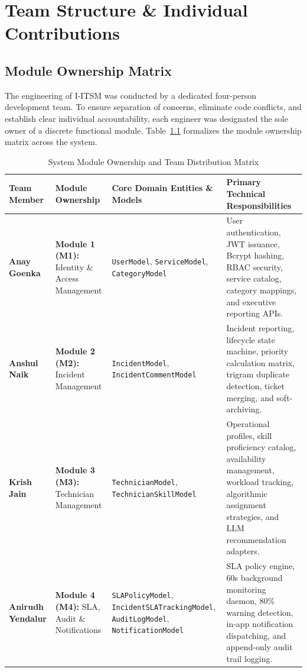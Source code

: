 \documentclass[11pt,a4paper,oneside]{report}
\begin{document}
\chapter{Team Structure \& Individual Contributions}
\label{ch:team_structure}

\section{Module Ownership Matrix}
\label{sec:team_matrix}
The engineering of I-ITSM was conducted by a dedicated four-person development team. To ensure separation of concerns, eliminate code conflicts, and establish clear individual accountability, each engineer was designated the sole owner of a discrete functional module. Table~\ref{tab:team_ownership_matrix} formalizes the module ownership matrix across the system.

\begin{table}[H]
\centering
\small
\caption{System Module Ownership and Team Distribution Matrix}
\label{tab:team_ownership_matrix}
\begin{tabular}{p{2.6cm}p{3.2cm}p{4.2cm}p{4.5cm}}
\toprule
\textbf{Team Member} & \textbf{Module Ownership} & \textbf{Core Domain Entities \& Models} & \textbf{Primary Technical Responsibilities} \\
\midrule
\textbf{Anay Goenka} & \textbf{Module 1 (M1):} Identity \& Access Management & \texttt{UserModel}, \texttt{ServiceModel}, \texttt{CategoryModel} & User authentication, JWT issuance, Bcrypt hashing, RBAC security, service catalog, category mappings, and executive reporting APIs. \\
\addlinespace
\textbf{Anshul Naik} & \textbf{Module 2 (M2):} Incident Management & \texttt{IncidentModel}, \texttt{IncidentCommentModel} & Incident reporting, lifecycle state machine, priority calculation matrix, trigram duplicate detection, ticket merging, and soft-archiving. \\
\addlinespace
\textbf{Krish Jain} & \textbf{Module 3 (M3):} Technician Management & \texttt{TechnicianModel}, \texttt{TechnicianSkillModel} & Operational profiles, skill proficiency catalog, availability management, workload tracking, algorithmic assignment strategies, and LLM recommendation adapters. \\
\addlinespace
\textbf{Anirudh Yendalur} & \textbf{Module 4 (M4):} SLA, Audit \& Notifications & \texttt{SLAPolicyModel}, \texttt{IncidentSLATrackingModel}, \texttt{AuditLogModel}, \texttt{NotificationModel} & SLA policy engine, 60s background monitoring daemon, 80\% warning detection, in-app notification dispatching, and append-only audit trail logging. \\
\bottomrule
\end{tabular}
\end{table}
\end{document}
